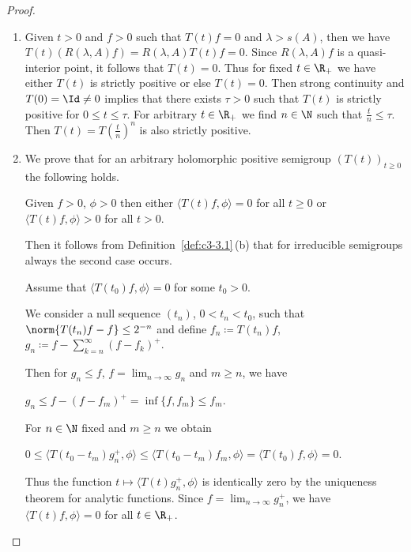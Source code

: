 \begin{proof}
\begin{enumerate}[\upshape (i), wide, labelindent=.25em]
	\item
	Given $t > 0$ and $f > 0$ such that $T(t)f = 0$ and $\lambda > s(A)$, then we have $T(t)(R(\lambda,A)f) = R(\lambda,A)T(t)f = 0$.
	Since $R(\lambda,A)f$ is a quasi-interior point, it follows that $T(t) = 0$.
	Thus for fixed $t \in \R _{+}$ we have either $T(t)$ is strictly positive or else $T(t) = 0$.
	Then strong continuity and $T(0) = \Id \neq 0$ implies that there exists $\tau > 0$ such that $T(t)$ is strictly positive for $0 \leq t \leq \tau$.
	For arbitrary $t \in \R _{+}$ we find $n \in \N$ such that $\frac{t}{n} \leq \tau$.
	Then $T(t) = T(\frac{t}{n})^{n}$ is also strictly positive.
	
	\item
	We prove that for an arbitrary holomorphic positive semigroup $(T(t))_{t\geq 0}$ the following holds.
	
	Given $f > 0$, $\phi > 0$ then either $\langle T(t)f,\phi \rangle = 0$ for all $t \geq 0$ or $\langle T(t)f,\phi \rangle > 0$ for all $t > 0$.
	
	Then it follows from Definition~\ref{def:c3-3.1}\,(b) that for irreducible semigroups always the second case occurs.
	
	Assume that $\langle T(t_{0})f,\phi \rangle = 0$ for some $t_{0} > 0$.
	
	We consider a null sequence $(t_{n})$, $0 < t_{n} < t_{0}$, such that $\norm{T(t_{n})f - f} \leq 2^{-n}$ and define $f_{n} \coloneqq T(t_{n})f$, $g_{n} \coloneqq f - \sum_{k=n}^{\infty}(f-f_{k})^{+}$.
	
	Then for $g_{n} \leq f$, $f = \lim_{n\to\infty}g_{n}$ and $m \geq n$, 
	we have 
	
	$g_{n} \leq f - (f-f_{m})^{+} = \inf\{f,f_{m}\} \leq f_{m}$.
	
	For $n \in \N$ fixed and $m \geq n$ we obtain 
	
	$0 \leq \langle T(t_{0}-t_{m})g_{n}^{+},\phi \rangle \leq \langle T(t_{0}-t_{m})f_{m},\phi \rangle = \langle T(t_{0})f,\phi \rangle = 0$.
	
	Thus the function $t \mapsto \langle T(t)g_{n}^{+},\phi \rangle$ is identically zero by the uniqueness theorem for analytic functions.
	Since $f = \lim_{n\to\infty}g_{n}^{+}$, we have $\langle T(t)f,\phi \rangle = 0$ for all $t \in \R _{+}$.
\end{enumerate}
\end{proof}

